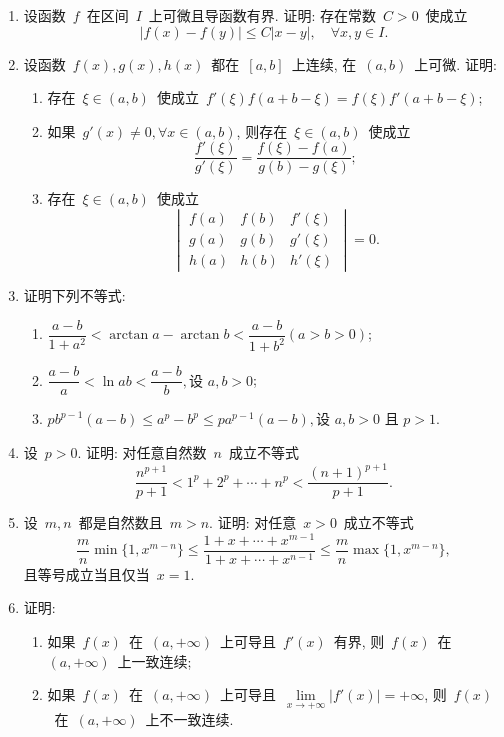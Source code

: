 \documentclass[UTF8,a4paper,20pt]{article}
\begin{document}
\begin{enumerate}
\item 设函数~$f$~在区间~$I$~上可微且导函数有界. 证明: 存在常数~$C>0$~使成立
\[|f(x)-f(y)|\leqslant C|x-y|, \quad \forall x,y\in I.\]

\item 设函数~$f(x), g(x), h(x)$~都在~$[a,b]$~上连续, 在~$(a,b)$~上可微. 证明:
	\begin{enumerate}[(1)]
	\item 存在~$\xi\in(a,b)$~使成立~$f'(\xi)f(a+b-\xi)=f(\xi)f'(a+b-\xi)$;
	\item 如果~$g'(x)\neq 0, \forall x\in (a,b)$, 则存在~$\xi\in(a,b)$~使成立
		\[\dfrac{f'(\xi)}{g'(\xi)}=\dfrac{f(\xi)-f(a)}{g(b)-g(\xi)};\]
	\item 存在~$\xi\in(a,b)$~使成立
		\[ \begin{vmatrix} f(a) & f(b) & f'(\xi)\\ g(a) & g(b) & g'(\xi)\\ h(a) & h(b) & h'(\xi) \end{vmatrix}=0.\]
	\end{enumerate}

\item 证明下列不等式: 
	\begin{enumerate}[(1)]
	\item $\dfrac{a-b}{1+a^2}<\arctan{a}-\arctan{b}<\dfrac{a-b}{1+b^2}(a>b>0)$;
	\item $\dfrac{a-b}{a}<\ln{a}{b}<\dfrac{a-b}{b}, \text{设~$a,b>0$}$;
	\item $pb^{p-1}(a-b)\leqslant a^p-b^p \leqslant pa^{p-1}(a-b), \text{设~$a,b>0$~且~$p>1$}$.
	\end{enumerate}

\item 设~$p>0$. 证明: 对任意自然数~$n$~成立不等式
\[\dfrac{n^{p+1}}{p+1}<1^p+2^p+\cdots+n^p<\dfrac{(n+1)^{p+1}}{p+1}.\]

\item 设~$m,n$~都是自然数且~$m>n$. 证明: 对任意~$x>0$~成立不等式
\[\dfrac{m}{n}\min\{1,x^{m-n}\}\leqslant \dfrac{1+x+\cdots+x^{m-1}}{1+x+\cdots+x^{n-1}}\leqslant \dfrac{m}{n}\max\{1,x^{m-n}\},\]
且等号成立当且仅当~$x=1$.

\item 证明: 
	\begin{enumerate}[(1)]
	\item 如果~$f(x)$~在~$(a,+\infty)$~上可导且~$f'(x)$~有界, 则~$f(x)$~在~$(a,+\infty)$~上一致连续;	
	\item 如果~$f(x)$~在~$(a,+\infty)$~上可导且~$\lim\limits_{x\to+\infty}|f'(x)|=+\infty$, 则~$f(x)$~在~$(a,+\infty)$~上不一致连续.
	\end{enumerate}


\end{enumerate}
\end{document}

